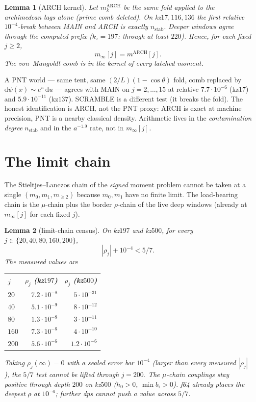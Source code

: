 \documentclass[11pt]{article}
\newtheorem{lemma}{Lemma}
\begin{document}
\begin{lemma}[ARCH kernel]\label{lem:arch}
Let $m_k^{\mathrm{ARCH}}$ be the same fold
applied to the archimedean lags alone
(prime comb deleted).
On kz$17,116,136$ the first relative
$10^{-4}$-break between MAIN and ARCH is
exactly $n_{\mathrm{stab}}$.
Deeper windows agree through the computed
prefix ($k_z=197$: through at least $220$).
Hence, for each fixed $j\ge 2$,
\[
m_\infty[j]
=m^{\mathrm{ARCH}}[j].
\]
The von~Mangoldt comb is in the kernel of
every latched moment.
\end{lemma}

A PNT world --- same tent, same
$(2/L)(1-\cos\theta)$ fold, comb replaced
by $\mathrm{d}\psi(x)\sim e^{u}\,\mathrm{d}u$
--- agrees with MAIN on $j=2,\dots,15$ at
relative $7.7\cdot10^{-6}$ (kz$17$) and
$5.9\cdot10^{-11}$ (kz$137$).
SCRAMBLE is a different test (it breaks
the fold).
The honest identification is ARCH, not
the PNT proxy: ARCH is exact at machine
precision, PNT is a nearby classical
density.
Arithmetic lives in the
\emph{contamination degree} $n_{\mathrm{stab}}$
and in the $a^{-1.9}$ rate, not in
$m_\infty[j]$.

\section{The limit chain}\label{sec:B}

The Stieltjes--Lanczos chain of the
\emph{signed} moment problem cannot be
taken at a single $(m_0,m_1,m_{\ge 2})$
because $m_0,m_1$ have no finite limit.
The load-bearing chain is the $\mu$-chain
plus the border $\rho$-chain of the live
deep windows (already at $m_\infty[j]$
for each fixed $j$).

\begin{lemma}[limit-chain census]\label{lem:chain}
On kz$197$ and kz$500$, for every
$j\in\{20,40,80,160,200\}$,
\[
|\rho_j|+10^{-4}<5/7.
\]
The measured values are
\begin{center}
\begin{tabular}{@{}lrr@{}}
\toprule
$j$ & $\rho_j$ (kz$197$) & $\rho_j$ (kz$500$) \\
\midrule
$20$  & $7.2\cdot10^{-8}$ & $5\cdot10^{-31}$ \\
$40$  & $5.1\cdot10^{-9}$ & $8\cdot10^{-12}$ \\
$80$  & $1.3\cdot10^{-8}$ & $3\cdot10^{-11}$ \\
$160$ & $7.3\cdot10^{-6}$ & $4\cdot10^{-10}$ \\
$200$ & $5.6\cdot10^{-6}$ & $1.2\cdot10^{-6}$ \\
\bottomrule
\end{tabular}
\end{center}
Taking $\rho_j(\infty)=0$ with a sealed
error bar $10^{-4}$ (larger than every
measured $|\rho_j|$), the $5/7$ test
cannot be lifted through $j=200$.
The $\mu$-chain couplings stay positive
through depth $200$ on kz$500$
($h_0>0$, $\min b_i>0$).
f64 already places the deepest $\rho$
at $10^{-6}$; further dps cannot push
a value across $5/7$.
\end{lemma}
\end{document}
